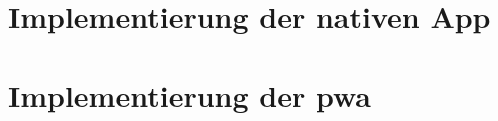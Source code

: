 
\section{Implementierung der nativen App}	\label{sec:5-1_ios}


\newpage

\section{Implementierung der \ac{pwa}} \label{sec:5-2_pwa}


